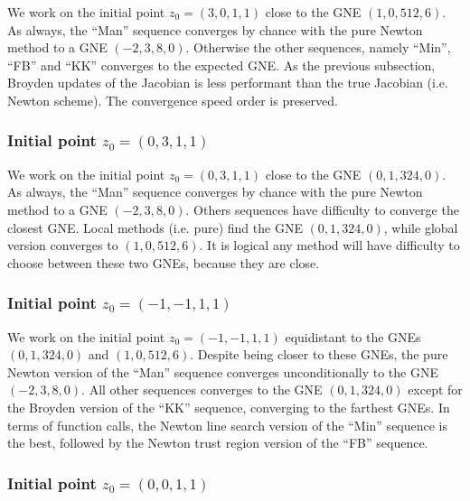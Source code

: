 \documentclass[11pt, a4paper]{article}
\begin{document}
We work on the initial point $z_0 = (3, 0,  1,  1)$ close to the GNE $(1, 0, 512, 6)$. As always, the ``Man'' sequence converges by chance with the pure Newton method to a GNE $(-2, 3, 8, 0)$. Otherwise the other sequences, namely ``Min'', ``FB'' and ``KK'' converges to the expected GNE. As the previous subsection, Broyden updates of the Jacobian is less performant than the true Jacobian (i.e. Newton scheme). The convergence speed order is preserved.






\subsubsection{Initial point $z_0 = (0, 3, 1, 1)$}

We work on the initial point $z_0 = (0, 3, 1,  1)$ close to the GNE $(0, 1, 324, 0)$. As always, the ``Man'' sequence converges by chance with the pure Newton method to a GNE $(-2, 3, 8, 0)$. Others sequences have difficulty to converge the closest GNE. Local methods (i.e. pure) find the GNE $(0, 1, 324, 0)$, while global version converges to $(1, 0, 512, 6)$. It is logical any method will have difficulty to choose between these two GNEs, because they are close. 



\subsubsection{Initial point $z_0 = (-1, -1, 1,  1)$}

We work on the initial point $z_0 = (-1, -1, 1,  1)$ equidistant to the GNEs $(0, 1, 324, 0)$ and $(1, 0, 512, 6)$. Despite being closer to these GNEs, the pure Newton version of the ``Man'' sequence converges unconditionally to the GNE $(-2, 3, 8, 0)$. All other sequences converges to the GNE $(0, 1, 324, 0)$  except for the Broyden version of the ``KK'' sequence, converging to the farthest GNEs. In terms of function calls, the Newton line search version of the ``Min'' sequence is the best, followed by the Newton trust region version of the ``FB'' sequence.



\subsubsection{Initial point $z_0 = (0, 0, 1,  1)$}
\end{document}
